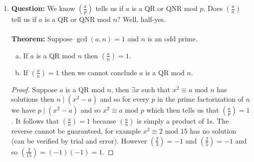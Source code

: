 \documentclass[class=article, crop=false]{standalone}
\def\leg#1#2{\left(\frac{#1}{#2}\right)}
\begin{document}
\begin{enumerate}
	\item \textbf{Question:} We know $\left(\frac{a}{p}\right)$ tells us if $a$ is a QR or QNR mod $p$.
	Does $\left(\frac{a}{n}\right)$ tell us if $a$ is a QR or QNR mod $n$?
	Well, half-yes.\\\\
	\textbf{Theorem:} Suppose $\gcd(a,n)=1$ and $n$ is an odd prime.
	\begin{enumerate}[(a)]
		\item If $a$ is a QR mod $n$ then $\left(\frac{a}{n}\right)=1$.
		\item If $\left(\frac{a}{n}\right)=1$ then we cannot conclude $a$ is a QR mod $n$.
	\end{enumerate}
	\begin{proof}
		Suppose $a$ is a QR mod $n$, then $\exists x$ such that
		$x^2\equiv a\mbox{ mod }n$ has solutions then $n\mid (x^2-a)$ and so for every $p$
		in the prime factorization of $n$ we have $p\mid(x^2-a)$ and so $x^2\equiv a\mbox{ mod }p$
		which then tells us that $\leg{a}{p}=1$. It follows that $\leg{a}{n}=1$ because
		$\leg{a}{n}$ is simply a product of 1s. The reverse cannot be guaranteed,
		for example $x^2 \equiv 2\mbox{ mod } 15$ has no solution (can be verified by trial and
		error). However $\leg{2}{3}=-1$ and $\leg{2}{5}=-1$ and so $\leg{2}{15}=(-1)(-1)=1$.
	\end{proof}


\end{enumerate}
\end{document}
